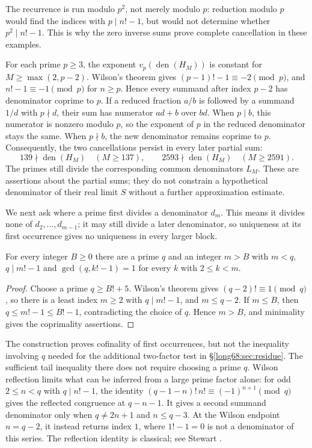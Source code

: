 \documentclass[11pt]{article}
\newcommand{\den}{\operatorname{den}}
\begin{document}
The recurrence is run modulo $p^2$, not merely modulo $p$: reduction
modulo $p$ would find the indices with $p\mid n!-1$, but would not
determine whether $p^2\mid n!-1$. This is why the zero inverse sums prove complete
cancellation in these examples.

For each prime $p\ge3$, the exponent $v_p(\den(H_M))$ is constant for
$M\ge\max(2,p-2)$. Wilson's theorem gives
$(p-1)!-1\equiv-2\pmod p$, and $n!-1\equiv-1\pmod p$ for $n\ge p$.
Hence every summand after index $p-2$ has denominator coprime to $p$. If a reduced fraction
$a/b$ is followed by a summand $1/d$ with $p\nmid d$, their sum has
numerator $ad+b$ over $bd$. When $p\mid b$, this numerator is nonzero
modulo $p$, so the exponent of $p$ in the reduced denominator stays the
same. When $p\nmid b$, the new denominator remains coprime to $p$.
Consequently, the two cancellations persist in every later partial sum:
\[
 139\nmid\den(H_M)\quad(M\ge137),\qquad
 2593\nmid\den(H_M)\quad(M\ge2591).
\]
The primes still divide the corresponding common denominators $L_M$.
These are assertions about the partial sums; they do not constrain a
hypothetical denominator of their real limit $S$ without a further
approximation estimate.

We next ask where a prime first divides a denominator $d_m$. This means
it divides none of $d_2,\ldots,d_{m-1}$; it may still divide a later
denominator, so uniqueness at its first occurrence gives no uniqueness
in every larger block.

\begin{proposition}\label{long68:res:wilson-cofinality}
For every integer $B\ge0$ there are a prime $q$ and an integer $m>B$ with
$m<q$, $q\mid m!-1$ and $\gcd(q,k!-1)=1$ for every $k$ with $2\le k<m$.
\end{proposition}

\begin{proof}
Choose a prime $q\ge B!+5$.  Wilson's theorem gives $(q-2)!\equiv1\pmod q$,
so there is a least index $m\ge2$ with $q\mid m!-1$, and $m\le q-2$.
If $m\le B$, then
$q\le m!-1\le B!-1$, contradicting the choice of $q$.  Hence $m>B$, and
minimality gives the coprimality assertions.
\end{proof}

The construction proves cofinality of first occurrences, but not the
inequality involving $q$ needed for the additional two-factor test in
\S\ref{long68:sec:residue}. The sufficient tail inequality there does not
require choosing a prime $q$. Wilson reflection limits what can be inferred
from a large prime factor alone: for odd $2\le n<q$ with $q\mid n!-1$,
the identity $(q-1-n)!\,n!\equiv(-1)^{n+1}\pmod q$ gives the reflected
congruence at $q-n-1$. It gives a second summand denominator only when
$q\ne2n+1$ and $n\le q-3$. At the Wilson endpoint $n=q-2$, it instead
returns index $1$, where $1!-1=0$ is not a denominator of this series.  The reflection identity is classical; see Stewart
\cite[p.~462, (4)]{stewart2004}.
\end{document}
